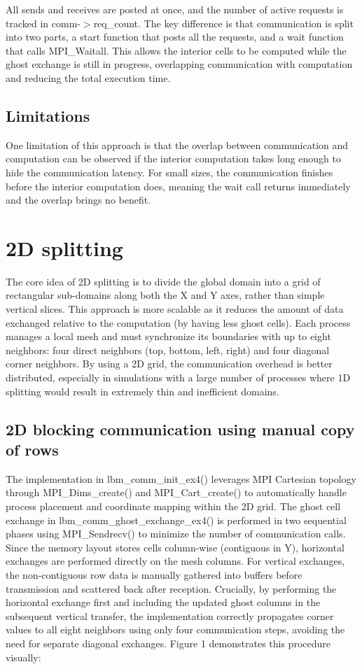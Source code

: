 \documentclass{article}
\begin{document}
All sends and receives are posted at once, and the number of active requests is tracked in comm-$>$req\_count. The key difference is that communication is split into two parts, a start function that posts all the requests, and a wait function that calls MPI\_Waitall. This allows the interior cells to be computed while the ghost exchange is still in progress, overlapping communication with computation and reducing the total execution time.

\subsection{Limitations}
One limitation of this approach is that the overlap between communication and computation can be observed if the interior computation takes long enough to hide the communication latency. For small  sizes, the communication finishes before the interior computation does, meaning the wait call returns immediately and the overlap brings no benefit.

\section{2D splitting}

The core idea of 2D splitting is to divide the global domain into a grid of rectangular sub-domains along both the X and Y axes, rather than simple vertical slices. This approach is more scalable as it reduces the amount of data exchanged relative to the computation (by having less ghost cells). Each process manages a local mesh and must synchronize its boundaries with up to eight neighbors: four direct neighbors (top, bottom, left, right) and four diagonal corner neighbors. By using a 2D grid, the communication overhead is better distributed, especially in simulations with a large number of processes where 1D splitting would result in extremely thin and inefficient domains.

\subsection{2D blocking communication using manual copy of rows}

The implementation in lbm\_comm\_init\_ex4() leverages MPI Cartesian topology through MPI\_Dims\_create() and MPI\_Cart\_create() to automatically handle process placement and coordinate mapping within the 2D grid. The ghost cell exchange in lbm\_comm\_ghost\_exchange\_ex4() is performed in two sequential phases using MPI\_Sendrecv() to minimize the number of communication calls. Since the memory layout stores cells column-wise (contiguous in Y), horizontal exchanges are performed directly on the mesh columns. For vertical exchanges, the non-contiguous row data is manually gathered into buffers before transmission and scattered back after reception. Crucially, by performing the horizontal exchange first and including the updated ghost columns in the subsequent vertical transfer, the implementation correctly propagates corner values to all eight neighbors using only four communication steps, avoiding the need for separate diagonal exchanges. Figure 1 demonstrates this procedure visually: 
\end{document}
